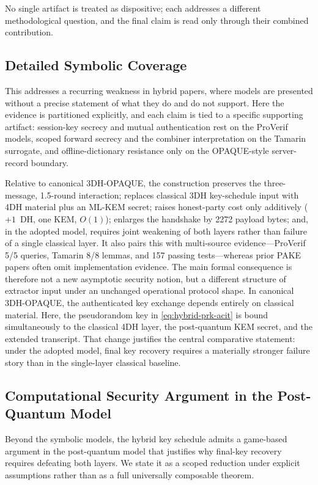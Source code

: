 \documentclass[conference]{IEEEtran}
\begin{document}
No single artifact is treated as dispositive; each addresses a different methodological question, and the final claim is read only through their combined contribution.

\subsection{Detailed Symbolic Coverage}


This addresses a recurring weakness in hybrid papers, where models are presented without a precise statement of what they do and do not support. Here the evidence is partitioned explicitly, and each claim is tied to a specific supporting artifact: session-key secrecy and mutual authentication rest on the ProVerif models, scoped forward secrecy and the combiner interpretation on the Tamarin surrogate, and offline-dictionary resistance only on the OPAQUE-style server-record boundary.

Relative to canonical 3DH-OPAQUE, the construction preserves the three-message, 1.5-round interaction; replaces classical 3DH key-schedule input with 4DH material plus an ML-KEM secret; raises honest-party cost only additively ($+1$~DH, one KEM, $O(1)$); enlarges the handshake by 2272 payload bytes; and, in the adopted model, requires joint weakening of both layers rather than failure of a single classical layer. It also pairs this with multi-source evidence---ProVerif 5/5 queries, Tamarin 8/8 lemmas, and 157 passing tests---whereas prior PAKE papers often omit implementation evidence. The main formal consequence is therefore not a new asymptotic security notion, but a different structure of extractor input under an unchanged operational protocol shape. In canonical 3DH-OPAQUE, the authenticated key exchange depends entirely on classical material. Here, the pseudorandom key in \eqref{eq:hybrid-prk-acit} is bound simultaneously to the classical 4DH layer, the post-quantum KEM secret, and the extended transcript. That change justifies the central comparative statement: under the adopted model, final key recovery requires a materially stronger failure story than in the single-layer classical baseline.

\subsection{Computational Security Argument in the Post-Quantum Model}

Beyond the symbolic models, the hybrid key schedule admits a game-based argument in the post-quantum model that justifies why final-key recovery requires defeating both layers. We state it as a scoped reduction under explicit assumptions rather than as a full universally composable theorem.
\end{document}
